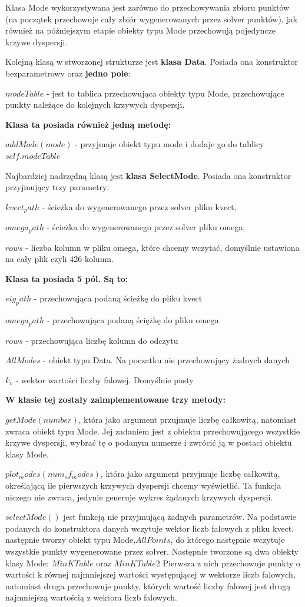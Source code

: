 Klasa Mode wykorzystywana jest zarówno do przechowywania zbioru punktów (na początek przechowuje cały zbiór wygenerowanych przez solver punktów), jak również na późniejszym etapie obiekty typu Mode przechowują pojedyncze krzywe dyspersji.

Kolejną klasą w stworzonej strukturze jest \textbf{klasa Data}. Posiada ona konstruktor bezparametrowy oraz \textbf{jedno pole}:

$modeTable$ - jest to tablica przechowująca obiekty typu Mode, przechowujące punkty należące do kolejnych krzywych dyspersji.

\textbf{Klasa ta posiada również jedną metodę:}

$addMode(mode)$ - przyjmuje obiekt typu mode i dodaje go do tablicy $self.modeTable$

Najbardziej nadrzędną klasą jest \textbf{klasa SelectMode}. Posiada ona konstruktor przyjmujący trzy parametry: 

$kvect_path$ - ścieżka do wygenerowanego przez solver pliku kvect, 

$omega_path$ - ścieżka do wygenerowanego przez solver pliku omega, 

$rows$ - liczba kolumn w pliku omega, które chcemy wczytać, domyślnie ustawiona na cały plik czyli 426 kolumn.

\textbf{Klasa ta posiada 5 pól. Są to:}

$eig_path$ - przechowująca podaną ścieżkę do pliku kvect

$omega_path$ - przechowująca podaną ściężkę do pliku omega

$rows$ - przechowująca liczbę kolumn do odczytu

$AllModes$ - obiekt typu Data. Na poczatku nie przechowujący żadnych danych

$k_v$ - wektor wartości liczby falowej. Domyślnie pusty

\textbf{W klasie tej zostały zaimplementowane trzy metody:}

$getMode(number)$, która jako argument przujmuje liczbę całkowitą, natomiast zwraca obiekt typu Mode. Jej zadaniem jest z obiektu przechowującego wszystkie krzywe dyspersji, wybrać tę o podanym numerze i zwrócić ją w postaci obiektu klasy Mode.

$plot_modes(num_of_modes)$, która jako argument przyjmuje liczbę całkowitą, określającą ile pierwszych krzywych dyspersji chcemy wyświetlić. Ta funkcja niczego nie zwraca, jedynie generuje wykres żądanych krzywych dyspersji.

$selectMode()$ jest funkcją nie przyjmującą żadnych parametrów. Na podstawie podanych do konstruktora danych wczytuje wektor liczb falowych z pliku kvect. następnie tworzy obiekt typu Mode,$AllPoints$, do którego następnie wczytuje wszystkie punkty wygenerowane przez solver. Następnie tworzone są dwa obiekty klasy Mode: $MinKTable$ oraz $MinKTable2$ Pierwsza z nich przechowuje punkty o wartości k równej najmniejszej wartości występującej w wektorze liczb falowych, natomiast druga przechowuje punkty, których wartość liczby falowej jest drugą najmniejszą wartością z wektora liczb falowych.

